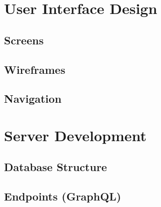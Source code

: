 \documentclass[12pt,a4paper]{book}
\theoremstyle{definition}
\theoremstyle{remark}
\begin{document}

% 
% 


% 
% 
% 

\tableofcontents


\chapter{User Interface Design}
    \section{Screens}
    \section{Wireframes}
    \section{Navigation}

\chapter{Server Development}
    \section{Database Structure}
    \section{Endpoints (GraphQL)}
\end{document}
